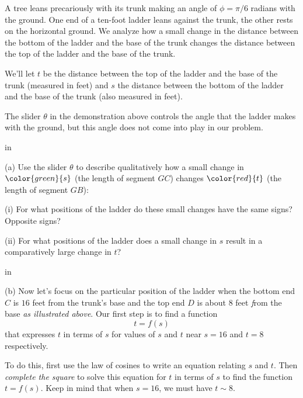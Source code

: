 \documentclass{ximera}
\newcommand{\pskip}{\vskip 0.1 in}
\begin{document}
\begin{example}  \label{Ex324trertg}

A tree leans precariously with its trunk making an angle of $\phi = \pi/6$ radians with the ground. One end of a ten-foot ladder leans against the trunk, the other rests on the horizontal ground. We analyze how a small change in the distance between the bottom of the ladder and the base of the trunk changes the distance between the top of the ladder and the base of the trunk.


 
\begin{onlineOnly}
    \begin{center}
\end{center}
\end{onlineOnly}

We'll let $t$ be the distance between the top of the ladder and the base of the trunk (measured in feet) and $s$ the distance between the bottom of the ladder and the base of the trunk (also measured in feet).

The slider $\theta$ in the demonstration above controls the angle that the ladder makes with the ground, but this angle does not come into play in our problem.

\pskip

(a) Use the slider $\theta$ to describe qualitatively how a small change in $\color{green}{s}$ (the length of segment $GC$) changes $\color{red}{t}$ (the length of segment $GB$):

(i) For what positions of the ladder do these small changes have the same signs? Opposite signs?

(ii) For what positions of the ladder does a small change in $s$ result in a comparatively large change in $t$?

\pskip

(b) Now let's focus on the particular position of the ladder when the bottom end $C$ is $16$ feet from the trunk's base and the top end $D$ is about $8$ feet \emph from the base \emph{as illustrated above}. Our first step is to find a function 
\[
   t = f(s) 
\]
that expresses $t$ in terms of $s$ for values of $s$ and $t$ near $s=16$ and $t=8$ respectively. 

To do this, first use the law of cosines to write an equation relating $s$ and $t$. Then \emph{complete the square} to solve this equation for $t$ in terms of $s$ to find the function $t = f(s)$. Keep in mind that when $s=16$, we must have $t\sim 8$. 



\end{example}
\end{document}
